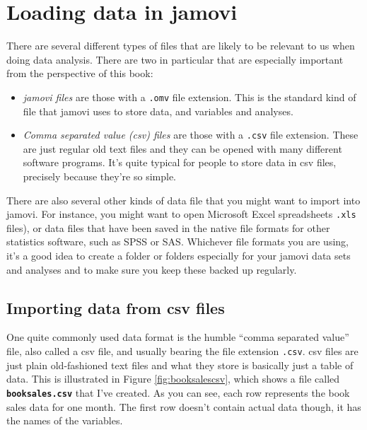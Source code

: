 \documentclass[
]{book}
\providecommand{\tightlist}{%
  \setlength{\itemsep}{0pt}\setlength{\parskip}{0pt}}
\begin{document}
\hypertarget{load}{%
\section{Loading data in jamovi}\label{load}}

There are several different types of files that are likely to be relevant to us when doing data analysis. There are two in particular that are especially important from the perspective of this book:

\begin{itemize}
\tightlist
\item
  \emph{jamovi files} are those with a \texttt{.omv} file extension. This is the standard kind of file that jamovi uses to store data, and variables and analyses.
\item
  \emph{Comma separated value (csv) files} are those with a \texttt{.csv} file extension. These are just regular old text files and they can be opened with many different software programs. It's quite typical for people to store data in csv files, precisely because they're so simple.
\end{itemize}

There are also several other kinds of data file that you might want to import into jamovi. For instance, you might want to open Microsoft Excel spreadsheets \texttt{.xls} files), or data files that have been saved in the native file formats for other statistics software, such as SPSS or SAS. Whichever file formats you are using, it's a good idea to create a folder or folders especially for your jamovi data sets and analyses and to make sure you keep these backed up regularly.

\hypertarget{importing-data-from-csv-files}{%
\subsection{Importing data from csv files}\label{importing-data-from-csv-files}}

One quite commonly used data format is the humble ``comma separated value'' file, also called a csv file, and usually bearing the file extension \texttt{.csv}. csv files are just plain old-fashioned text files and what they store is basically just a table of data. This is illustrated in Figure \ref{fig:booksalescsv}, which shows a file called \textbf{\texttt{booksales.csv}} that I've created. As you can see, each row represents the book sales data for one month. The first row doesn't contain actual data though, it has the names of the variables.
\end{document}
